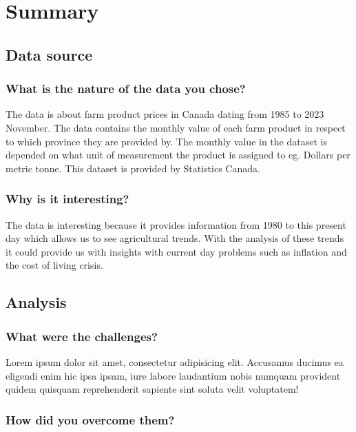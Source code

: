 \section{Summary}

\subsection{Data source}

\subsubsection{What is the nature of the data you chose?}

The data is about farm product prices in Canada dating from 1985 to 2023 November. The data contains the monthly value of 
each farm product in respect to which province they are provided by. The monthly value in the dataset is depended on what unit of measurement the product is assigned to eg. Dollars per metric tonne. This dataset is provided by Statistics Canada.


\subsubsection{Why is it interesting?}

The data is interesting because it provides information from 1980 to this present day which allows us to see agricultural trends. With the analysis of these trends it could provide us with insights with current day problems such as inflation and the cost of living crisis. 

\subsection{Analysis}

\subsubsection{What were the challenges?}

Lorem ipsum dolor sit amet, consectetur adipisicing elit. Accusamus ducimus ea eligendi enim hic ipsa ipsam, iure labore laudantium nobis numquam provident quidem quisquam reprehenderit sapiente sint soluta velit voluptatem!

\subsubsection{How did you overcome them?}


